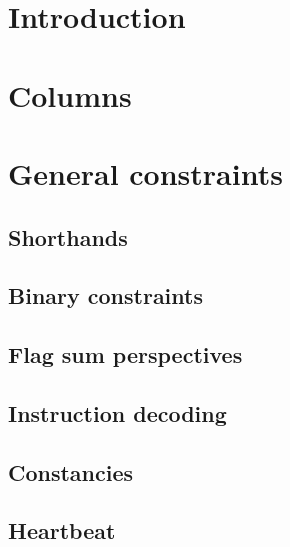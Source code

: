 

\section{Introduction}                                         \label{exp: intro}                                      
\section{Columns}                                              \label{exp: columns}                                    
\section{General constraints}                                  \label{exp: general}
\subsection{Shorthands}                                        \label{exp: general: shorthands}                        
\subsection{Binary constraints}                                \label{exp: general: binary}                            
\subsection{Flag sum perspectives}                             \label{exp: general: flag sums}                         
\subsection{Instruction decoding}                              \label{exp: general: instruction decoding}              
\subsection{Constancies}                                       \label{exp: general: constancies}                       
\subsection{Heartbeat}                                         \label{exp: general: heartbeat}                         
